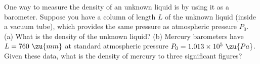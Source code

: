 One way to measure the density of an unknown liquid is by
using it as a barometer. Suppose you have a column of length $L$ of
the unknown liquid (inside a vacuum tube), which provides the same
pressure as atmospheric pressure $P_0$.\\
%
(a) What is the density of the unknown liquid?\answercheck\hwendpart
%
(b) 
Mercury barometers have $L = 760\ \zu{mm}$ at standard atmospheric pressure 
$P_0= 1.013 \times 10^5\ \zu{Pa}$. Given these data,
what is the density of mercury to three significant figures?\answercheck
